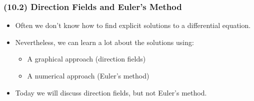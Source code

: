 \begin{frame}
\frametitle{(10.2) Direction Fields and Euler's Method} 
\begin{itemize}
\item  Often we don't know how to find explicit solutions to a differential equation.
\item  Nevertheless, we can learn a lot about the solutions using:
\begin{itemize}
\item  A graphical approach (direction fields)
\item  A numerical approach (Euler's method)
\end{itemize}
\item<2->  Today we will discuss direction fields, but not Euler's method.
\end{itemize}
\end{frame}

